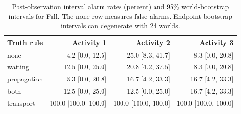 \begin{table}[tbp]
\centering
\caption{Post-observation interval alarm rates (percent) and 95\% world-bootstrap intervals for Full. The none row measures false alarms. Endpoint bootstrap intervals can degenerate with 24 worlds.}
\label{tab:stress}
\scriptsize
\setlength{\tabcolsep}{3pt}
\begin{tabular}{lrrr}
\toprule
Truth rule & Activity 1 & Activity 2 & Activity 3 \\
\midrule
none & 4.2 [0.0, 12.5] & 25.0 [8.3, 41.7] & 8.3 [0.0, 20.8] \\
waiting & 12.5 [0.0, 25.0] & 20.8 [4.2, 37.5] & 8.3 [0.0, 20.8] \\
propagation & 8.3 [0.0, 20.8] & 16.7 [4.2, 33.3] & 16.7 [4.2, 33.3] \\
both & 12.5 [0.0, 25.0] & 12.5 [0.0, 25.0] & 16.7 [4.2, 33.3] \\
transport & 100.0 [100.0, 100.0] & 100.0 [100.0, 100.0] & 100.0 [100.0, 100.0] \\
\bottomrule
\end{tabular}
\end{table}
